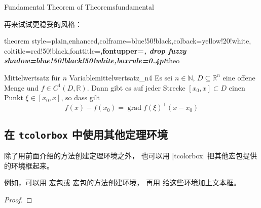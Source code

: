 \begin{dispExample}
\begin{Theorem}[enhanced,
    fuzzy halo=3mm with yellow,
    fuzzy halo=2mm with red,
    fuzzy halo=1mm with yellow,
    watermark color=red!35!white,
    watermark text={Overacting\\Fundamental Theorem}]%
  {Fundamental Theorem of Theorems}{fundamental}%
  \lipsum[1-2]
\end{Theorem}
\end{dispExample}

再来试试更稳妥的风格：

\begin{dispExample}
%
  {theorem style=plain,enhanced,colframe=blue!50!black,colback=yellow!20!white,
   coltitle=red!50!black,fonttitle=\upshape\bfseries,fontupper=\itshape,
   drop fuzzy shadow=blue!50!black!50!white,boxrule=0.4pt}{theo}

\begin{YetAnotherTheorem}{Mittelwertsatz f\"{u}r $n$ Variable}{mittelwertsatz_n4}%
  Es sei $n\in\mathbb{N}$, $D\subseteq\mathbb{R}^n$ eine offene Menge und
  $f\in C^{1}(D,\mathbb{R})$. Dann gibt es auf jeder Strecke
  $[x_0,x]\subset D$ einen Punkt $\xi\in[x_0,x]$, so dass gilt
  \begin{equation*}
  f(x)-f(x_0) = \operatorname{grad} f(\xi)^{\top}(x-x_0)
  \end{equation*}
\end{YetAnotherTheorem}
\end{dispExample}


\clearpage
\subsection{在 \texttt{tcolorbox} 中使用其他定理环境}\label{subsec:theorems_other}

除了用前面介绍的方法创建定理环境之外，
也可以用 |tcolorbox| 把其他宏包提供的环境框起来。

例如，可以用  宏包或  宏包的方法创建环境，
再用  给这些环境加上文本框。


\begin{dispExample}
\begin{lem}
  \lipsum[2]
\end{lem}

\lipsum[3]

\begin{proof}
  \lipsum*[4]
\end{proof}
\end{dispExample}
